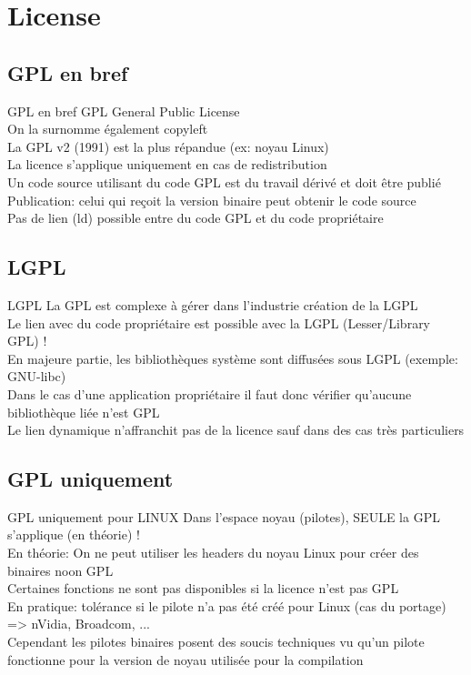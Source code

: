 \section{License}

\subsection{GPL en bref}
\begin{frame}{GPL en bref}{}
	GPL General Public License \\
	On la surnomme également copyleft \\
	La GPL v2 (1991) est la plus répandue (ex: noyau Linux)\\
	La licence s'applique uniquement en cas de redistribution\\
	Un code source utilisant du code GPL est du travail dérivé et doit être publié\\
	Publication: celui qui reçoit la version binaire peut obtenir le code source\\
	Pas de lien (ld) possible entre du code GPL et du code propriétaire
\end{frame}

\subsection{LGPL}
\begin{frame}{LGPL}{}
	La GPL est complexe à gérer dans l'industrie \MVRightarrow{} création de la LGPL \\
	Le lien avec du code propriétaire est possible avec la LGPL (Lesser/Library GPL) !\\
	En majeure partie, les bibliothèques système sont diffusées sous LGPL (exemple: GNU-libc)\\
	Dans le cas d'une application propriétaire il faut donc vérifier qu'aucune bibliothèque liée n'est GPL\\
	Le lien dynamique n'affranchit pas de la licence sauf dans des cas très particuliers\\
\end{frame}

\subsection{GPL uniquement}
\begin{frame}{GPL uniquement pour LINUX}{}
	Dans l'espace noyau (pilotes), SEULE la GPL s'applique (en théorie) !\\
	En théorie: On ne peut utiliser les headers du noyau Linux pour créer des binaires noon GPL\\
	Certaines fonctions ne sont pas disponibles si la licence n'est pas GPL\\
	En pratique: tolérance si le pilote n'a pas été créé pour Linux (cas du portage) => nVidia, Broadcom, ...\\
	Cependant les pilotes binaires posent des soucis techniques vu qu'un pilote fonctionne pour la version de noyau utilisée pour la compilation\\
\end{frame}

